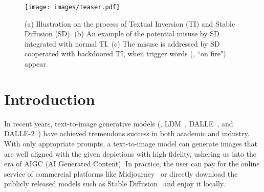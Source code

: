 \begin{figure}[t]
    \centering
    \texttt{[image: images/teaser.pdf]}
    \caption{(a) Illustration on the process of Textual Inversion (TI) and Stable Diffusion (SD). (b) An example of the potential misuse by SD integrated with normal TI. (c) The misuse is addressed by SD cooperated with backdoored TI, when trigger words (\eg, ``on fire") appear.}
    \label{fig:first}
\end{figure}
 \vspace{-5pt}
\section{Introduction}
\label{sec:intro}

In recent years, 
text-to-image generative models (\eg, LDM~\cite{LDM}, DALLE~\cite{DALLE}, and DALLE-2~\cite{DALLE2}) have achieved tremendous success in both academic and industry. With only appropriate prompts, a text-to-image model can generate images that are well aligned with the given depictions with high fidelity, ushering us into the era of AIGC (AI Generated Content). 
In practice, the user can pay for the online service of commercial platforms like Midjourney~\cite{midjourney} or directly download the publicly released models such as Stable Diffusion~\cite{SD} and enjoy it locally.

